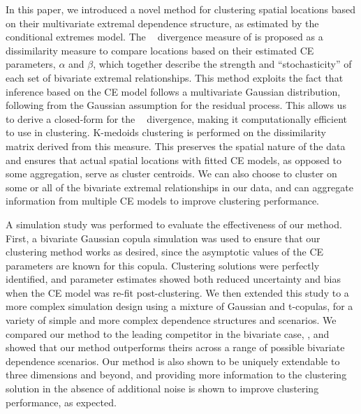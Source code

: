 \documentclass[12pt]{article}
\newcommand{\JSGa}{\mathop{\mathrm{JS}^{\mathrm{G}_{\lambda}}}\nolimits}
\DeclareMathOperator{\CE}{\mathrm{CE}}
\begin{document}
In this paper, we introduced a novel method for clustering spatial locations based on their multivariate extremal dependence structure, as estimated by the conditional extremes model.
The $\JSGa{}$ divergence measure of \citet{Nielsen2019} is proposed as a dissimilarity measure to compare locations based on their estimated CE parameters, $\alpha$ and $\beta$, which together describe the strength and ``stochasticity'' of each set of bivariate extremal relationships. 
This method exploits the fact that inference based on the CE model follows a multivariate Gaussian distribution, following from the Gaussian assumption for the residual process.
This allows us to derive a closed-form for the $\JSGa{}$ divergence, making it computationally efficient to use in clustering.
K-medoids clustering is performed on the dissimilarity matrix derived from this measure.
This preserves the spatial nature of the data and ensures that actual spatial locations with fitted CE models, as opposed to some aggregation, serve as cluster centroids. 
We can also choose to cluster on some or all of the bivariate extremal relationships in our data, and can aggregate information from multiple CE models to improve clustering performance.

A simulation study was performed to evaluate the effectiveness of our method.
First, a bivariate Gaussian copula simulation was used to ensure that our clustering method works as desired, since the asymptotic values of the CE parameters are known for this copula.
Clustering solutions were perfectly identified, and parameter estimates showed both reduced uncertainty and bias when the CE model was re-fit post-clustering. 
We then extended this study to a more complex simulation design using a mixture of Gaussian and t-copulas, for a variety of simple and more complex dependence structures and scenarios.
We compared our method to the leading competitor in the bivariate case, \citet{Vignotto2021}, and showed that our method outperforms theirs across a range of possible bivariate dependence scenarios. 
Our method is also shown to be uniquely extendable to three dimensions and beyond, and providing more information to the clustering solution in the absence of additional noise is shown to improve clustering performance, as expected.
\end{document}
